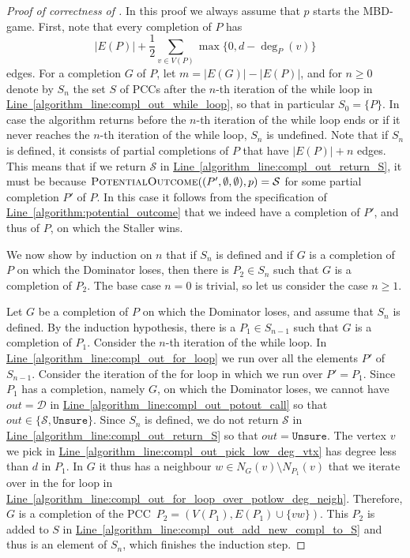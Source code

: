 \documentclass[a4paper,11pt,oneside]{scrartcl}
\theoremstyle{definition}
\theoremstyle{remark}
\newcommand{\pcc}{PCC}
\newcommand{\lineref}[1]{\hyperref[#1]{Line~\ref{#1}}}
\newcommand{\unsure}{\texttt{Unsure}}
\begin{document}
\begin{proof}[Proof of correctness of ]
    In this proof we always assume that $p$ starts the MBD-game. First, note that every completion of $P$ has 
    \[
        |E(P)| + \frac12\sum_{v \in V(P)} \max\{0, d - \deg_{P}(v)\}
    \]
    edges. For a completion $G$ of $P$, let $m = |E(G)| - |E(P)|$, and for $n \geq 0$ denote by $S_n$ the set $S$ of \pcc s after the $n$-th iteration of the while loop in \lineref{algorithm_line:compl_out_while_loop}, so that in particular $S_0 = \{P\}$. In case the algorithm returns before the $n$-th iteration of the while loop ends or if it never reaches the $n$-th iteration of the while loop, $S_n$ is undefined. Note that if $S_n$ is defined, it consists of partial completions of $P$ that have $|E(P)| + n$ edges. This means that if we return $\mathcal S$ in \lineref{algorithm_line:compl_out_return_S}, it must be because $\textsc{PotentialOutcome}((P',\emptyset,\emptyset), p) = \mathcal S$ for some partial completion $P'$ of $P$. In this case it follows from the specification of \lineref{algorithm:potential_outcome} that we indeed have a completion of $P'$, and thus of $P$, on which the Staller wins.
    
    
    We now show by induction on $n$ that if $S_n$ is defined and if $G$ is a completion of $P$ on which the Dominator loses, then there is $P_2 \in S_n$ such that $G$ is a completion of $P_2$. The base case $n=0$ is trivial, so let us consider the case $n \geq 1$.

    Let $G$ be a completion of $P$ on which the Dominator loses, and assume that $S_n$ is defined. By the induction hypothesis, there is a $P_1\in S_{n-1}$ such that $G$ is a completion of $P_1$. Consider the $n$-th iteration of the while loop. In \lineref{algorithm_line:compl_out_for_loop} we run over all the elements $P'$ of $S_{n-1}$. Consider the iteration of the for loop in which we run over $P' = P_1$. Since $P_1$ has a completion, namely $G$, on which the Dominator loses, we cannot have $out = \mathcal D$ in \lineref{algorithm_line:compl_out_potout_call} so that $out \in \{\mathcal S, \unsure\}$. Since $S_n$ is defined, we do not return $\mathcal S$ in \lineref{algorithm_line:compl_out_return_S} so that $out = \unsure$. The vertex $v$ we pick in \lineref{algorithm_line:compl_out_pick_low_deg_vtx} has degree less than $d$ in $P_1$. In $G$ it thus has a neighbour $w \in N_G(v) \setminus N_{P_1}(v)$ that we iterate over in the for loop in \lineref{algorithm_line:compl_out_for_loop_over_potlow_deg_neigh}. Therefore, $G$ is a completion of the \pcc\ $P_2=(V(P_1), E(P_1) \cup \{vw\})$. This $P_2$ is added to $S$ in \lineref{algorithm_line:compl_out_add_new_compl_to_S} and thus is an element of $S_n$, which finishes the induction step. 


\end{proof}
\end{document}
